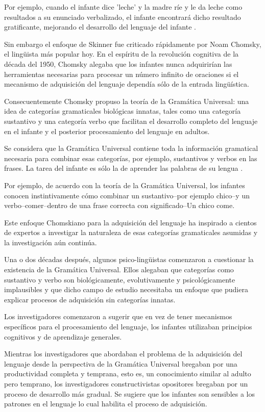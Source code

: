 Por ejemplo, cuando el infante dice 'leche' y la madre ríe y le da leche como resultados a su enunciado verbalizado, el infante encontrará dicho resultado gratificante, mejorando el desarrollo del lenguaje del infante \cite{doi:10.1111/j.1460-6984.2011.00086.x}. 

Sin embargo el enfoque de Skinner fue criticado rápidamente por Noam Chomsky, el lingüista más popular hoy. 
En el espíritu de la revolución cognitiva de la década del 1950, Chomsky alegaba que los infantes nunca adquirirían las herramientas necesarias para procesar un número infinito de oraciones si el mecanismo de adquisición del lenguaje dependía sólo de la entrada lingüística.

Consecuentemente Chomsky propuso la teoría de la Gramática Universal: una idea de categorías gramaticales biológicas innatas, tales como una categoría sustantivo y una categoría verbo que facilitan el desarrollo completo del lenguaje en el infante y el posterior procesamiento del lenguaje en adultos.

Se considera que la Gramática Universal contiene toda la información gramatical necesaria para combinar esas categorías, por ejemplo, sustantivos y verbos en las frases.
La tarea del infante es sólo la de aprender las palabras de su lengua \cite{doi:10.1111/j.1460-6984.2011.00086.x}.

Por ejemplo, de acuerdo con la teoría de la Gramática Universal, los infantes conocen instintivamente cómo combinar un sustantivo--por ejemplo chico--y un verbo--comer--dentro de una frase correcta con significado--Un chico come.

Este enfoque Chomskiano \cite{10.2307/j.ctt17kk81z.1} para la adquisición del lenguaje ha inspirado a cientos de expertos a investigar la naturaleza de esas categorías gramaticales asumidas y la investigación aún continúa.

Una o dos décadas después, algunos psico-lingüistas comenzaron a cuestionar la existencia de la Gramática Universal.
Ellos alegaban que categorías como sustantivo y verbo son biológicamente, evolutivamente y psicológicamente implausibles y que dicho campo de estudio necesitaba un enfoque que pudiera explicar procesos de adquisición sin categorías innatas.

Los investigadores comenzaron a sugerir que en vez de tener mecanismos específicos para el procesamiento del lenguaje, los infantes utilizaban principios cognitivos y de aprendizaje generales. 

Mientras los investigadores que abordaban el problema de la adquisición del lenguaje desde la perspectiva de la Gramática Universal bregaban por una productividad completa y temprana, esto es, un conocimiento similar al adulto pero temprano, los investigadores constructivistas opositores bregaban por un proceso de desarrollo más gradual.
Se sugiere que los infantes son sensibles a los patrones en el lenguaje lo cual habilita el proceso de adquisición.

